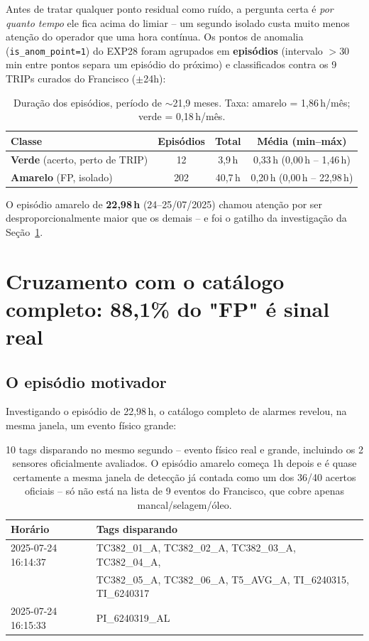 \documentclass[11pt,a4paper]{article}
\begin{document}
Antes de tratar qualquer ponto residual como ruído, a pergunta certa é
\emph{por quanto tempo} ele fica acima do limiar -- um segundo isolado
custa muito menos atenção do operador que uma hora contínua. Os pontos
de anomalia (\texttt{is\_anom\_point=1}) do EXP28 foram agrupados em
\textbf{episódios} (intervalo $>$30\,min entre pontos separa um
episódio do próximo) e classificados contra os 9 TRIPs curados do
Francisco ($\pm$24h):

\begin{table}[H]
\centering
\begin{tabular}{lccc}
\toprule
\textbf{Classe} & \textbf{Episódios} & \textbf{Total} & \textbf{Média (min--máx)} \\
\midrule
\textcolor{corVerde}{\textbf{Verde}} (acerto, perto de TRIP) & 12 & 3,9\,h & 0,33\,h (0,00\,h -- 1,46\,h) \\
\textcolor{corAmarelo}{\textbf{Amarelo}} (FP, isolado) & 202 & 40,7\,h & 0,20\,h (0,00\,h -- 22,98\,h) \\
\bottomrule
\end{tabular}
\caption{Duração dos episódios, período de $\sim$21,9 meses. Taxa:
amarelo = 1,86\,h/mês; verde = 0,18\,h/mês.}
\end{table}

O episódio amarelo de \textbf{22,98\,h} (24--25/07/2025) chamou
atenção por ser desproporcionalmente maior que os demais -- e foi o
gatilho da investigação da Seção~\ref{sec:cruzamento}.

\section{Cruzamento com o catálogo completo: 88,1\% do "FP" é sinal real}
\label{sec:cruzamento}

\subsection{O episódio motivador}

Investigando o episódio de 22,98\,h, o catálogo completo de alarmes
revelou, na mesma janela, um evento físico grande:

\begin{table}[H]
\centering
\small
\begin{tabular}{ll}
\toprule
\textbf{Horário} & \textbf{Tags disparando} \\
\midrule
2025-07-24 16:14:37 & TC382\_01\_A, TC382\_02\_A, TC382\_03\_A, TC382\_04\_A,\\
& TC382\_05\_A, TC382\_06\_A, T5\_AVG\_A, TI\_6240315, TI\_6240317 \\
2025-07-24 16:15:33 & PI\_6240319\_AL \\
\bottomrule
\end{tabular}
\caption{10 tags disparando no mesmo segundo -- evento físico real e
grande, incluindo os 2 sensores oficialmente avaliados. O episódio
amarelo começa 1h depois e é quase certamente a mesma janela de
detecção já contada como um dos 36/40 acertos oficiais -- só não está
na lista de 9 eventos do Francisco, que cobre apenas mancal/selagem/óleo.}
\end{table}
\end{document}
